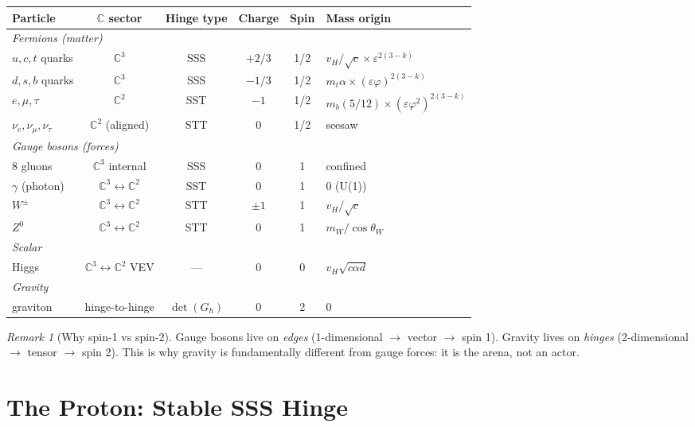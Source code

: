 \documentclass[12pt]{article}
\theoremstyle{remark}
\newtheorem{remark}[theorem]{Remark}
\begin{document}
\begin{center}
\small
\begin{tabular}{lccccl}
\hline
Particle & $\mathbb{C}$ sector & Hinge type & Charge & Spin & Mass origin \\
\hline
\multicolumn{6}{l}{\emph{Fermions (matter)}} \\
$u, c, t$ quarks & $\mathbb{C}^3$ & SSS & $+2/3$ & 1/2 & $v_H/\sqrt{c} \times \varepsilon^{2(3-k)}$ \\
$d, s, b$ quarks & $\mathbb{C}^3$ & SSS & $-1/3$ & 1/2 & $m_t\alpha \times (\varepsilon\varphi)^{2(3-k)}$ \\
$e, \mu, \tau$ & $\mathbb{C}^2$ & SST & $-1$ & 1/2 & $m_b(5/12) \times (\varepsilon\varphi^2)^{2(3-k)}$ \\
$\nu_e, \nu_\mu, \nu_\tau$ & $\mathbb{C}^2$ (aligned) & STT & $0$ & 1/2 & seesaw \\
\hline
\multicolumn{6}{l}{\emph{Gauge bosons (forces)}} \\
8 gluons & $\mathbb{C}^3$ internal & SSS & 0 & 1 & confined \\
$\gamma$ (photon) & $\mathbb{C}^3 \leftrightarrow \mathbb{C}^2$ & SST & 0 & 1 & 0 (U(1)) \\
$W^\pm$ & $\mathbb{C}^3 \leftrightarrow \mathbb{C}^2$ & STT & $\pm 1$ & 1 & $v_H/\sqrt{c}$ \\
$Z^0$ & $\mathbb{C}^3 \leftrightarrow \mathbb{C}^2$ & STT & 0 & 1 & $m_W/\cos\theta_W$ \\
\hline
\multicolumn{6}{l}{\emph{Scalar}} \\
Higgs & $\mathbb{C}^3 \leftrightarrow \mathbb{C}^2$ VEV & --- & 0 & 0 & $v_H\sqrt{c\alpha d}$ \\
\hline
\multicolumn{6}{l}{\emph{Gravity}} \\
graviton & hinge-to-hinge & $\det(G_h)$ & 0 & 2 & 0 \\
\hline
\end{tabular}
\end{center}

\begin{remark}[Why spin-1 vs spin-2]
Gauge bosons live on \emph{edges} (1-dimensional $\to$ vector $\to$ spin 1). Gravity lives on \emph{hinges} (2-dimensional $\to$ tensor $\to$ spin 2). This is why gravity is fundamentally different from gauge forces: it is the arena, not an actor.
\end{remark}

\section{The Proton: Stable SSS Hinge}
\end{document}
